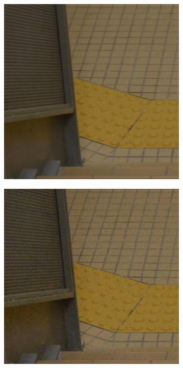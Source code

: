 \begin{figure}
    \hfill
    \begin{subfigure}[t]{0.24\textwidth}
        \centering
        \includegraphics[width=1\textwidth]{images/dataset/NikonD800_5_125_6400_stair_3_mean.JPG}
    \end{subfigure}
     \hfill
    \begin{subfigure}[t]{0.24\textwidth}
        \centering
        \includegraphics[width=1\textwidth]{images/dataset/NikonD800_5_125_6400_stair_3_real.JPG}

\end{subfigure}
\end{figure}
